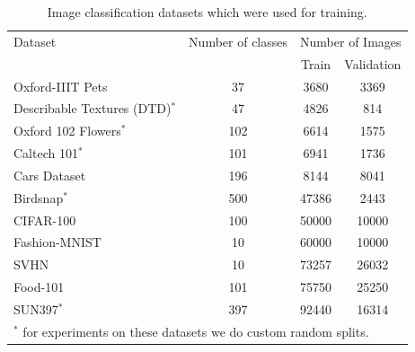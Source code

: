 \documentclass[runningheads]{llncs}
\begin{document}
\begin{table}
  \caption{Image classification datasets which were used for training.}
  \label{tab:data}
  \centering
  \begin{tabular}{l|c|c|c}
    Dataset & Number of classes & \multicolumn{2}{c}{Number of Images} \\
            &                   & Train     &   Validation \\ \hline
    Oxford-IIIT Pets\cite{parkhi12a} & 37 & 3680 & 3369 \\
    Describable Textures (DTD)$^*$ \cite{cimpoi14describing} & 47 & 4826 & 814 \\
    Oxford 102 Flowers$^*$ \cite{Nilsback08} & 102 & 6614 & 1575 \\
    Caltech 101$^*$ \cite{FeiFei2004LearningGV} & 101 & 6941 & 1736 \\
    Cars Dataset \cite{KrauseStarkDengFei-Fei_3DRR2013} & 196 & 8144 & 8041 \\
    Birdsnap$^*$ \cite{birdsnap} & 500 & 47386 & 2443 \\
    CIFAR-100 \cite{Krizhevsky2009LearningML} & 100 & 50000 & 10000 \\
    Fashion-MNIST \cite{fashionmnist} & 10 & 60000 & 10000 \\
    SVHN \cite{Netzer2011ReadingDI} & 10 & 73257 & 26032 \\
    Food-101 \cite{bossard14} & 101 & 75750 & 25250 \\
    SUN397$^*$ \cite{Xiao2010SUNDL} & 397 & 92440 & 16314 \\
    \hline
    \multicolumn{4}{l}{\footnotesize{$^*$ for experiments on these datasets we do custom random splits.}}
  \end{tabular}
\end{table}
\end{document}
